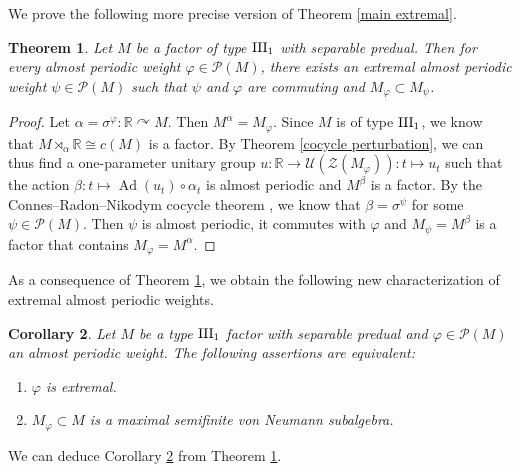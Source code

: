 \documentclass[a4paper,11pt]{amsart}
\numberwithin{equation}{section}
\newtheorem{theorem}{Theorem}[section]
\newtheorem{corollary}[theorem]{Corollary}
\theoremstyle{definition}
\newcommand{\R}{\mathbb{R}}
\newcommand{\cZ}{\mathcal{Z}}
\newcommand{\cP}{\mathcal{P}}
\newcommand{\Ad}{\operatorname{Ad}}
\newcommand{\III}{{\rm III}}
\begin{document}
We prove the following more precise version of Theorem \ref{main extremal}. 



\begin{theorem} \label{precise extremal}
    Let $M$ be a factor of type $\III_1$ with separable predual. Then for every almost periodic weight $\varphi \in \cP(M)$, there exists an extremal almost periodic weight $\psi \in \cP(M)$ such that $\psi$ and $\varphi$ are commuting and $M_\varphi \subset M_\psi$. 
\end{theorem}
\begin{proof}
    Let $\alpha =\sigma^\varphi : \R \curvearrowright M$. Then $M^\alpha=M_\varphi$. Since $M$ is of type $\III_1$, we know that $M \rtimes_\alpha \R \cong c(M)$ is a factor. By Theorem \ref{cocycle perturbation}, we can thus find a one-parameter unitary group $u : \R \to \mathcal U(\cZ(M_\varphi)) : t \mapsto u_t$ such that the action $\beta : t \mapsto \Ad(u_t) \circ \alpha_t$ is almost periodic and $M^\beta$ is a factor. By the Connes--Radon--Nikodym cocycle theorem \cite{Co72}, we know that $\beta=\sigma^\psi$ for some $\psi \in \cP(M)$. Then $\psi$ is almost periodic, it commutes with $\varphi$ and $M_\psi=M^\beta$ is a factor that contains $M_\varphi=M^\alpha$.
\end{proof}


As a consequence of Theorem \ref{precise extremal}, we obtain the following new characterization of extremal almost periodic weights.


\begin{corollary} \label{cor extremal}
 Let $M$ be a type $\III_1$ factor with separable predual and $\varphi \in \mathcal P(M)$ an almost periodic weight. The following assertions are equivalent: 
 \begin{enumerate}
 \item $\varphi$ is extremal.
 \item $M_\varphi \subset M$ is a maximal semifinite von Neumann subalgebra.
 \end{enumerate}
\end{corollary}

We can deduce Corollary \ref{cor extremal} from Theorem \ref{precise extremal}.
\end{document}
